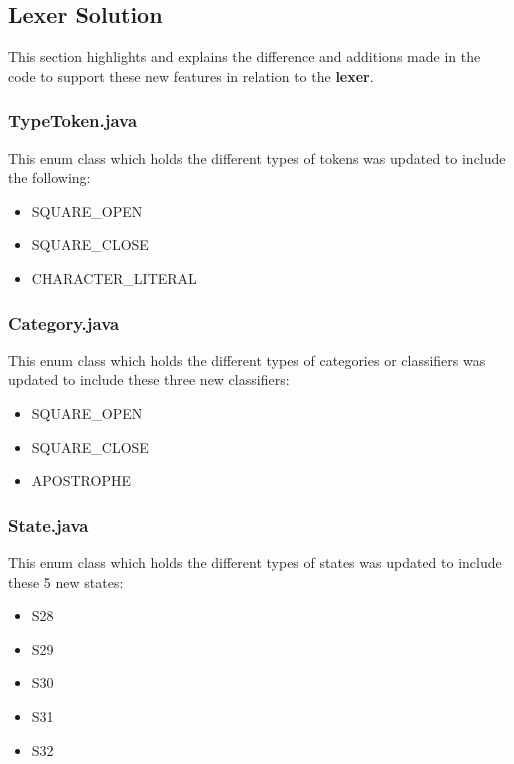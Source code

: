 \documentclass{article}
\begin{document}
			\subsection{Lexer Solution}
			
			This section highlights and explains the difference and additions made in the code to support these new features in relation to the \textbf{lexer}.
			
			\subsubsection{TypeToken.java}
					
					This enum class which holds the different types of tokens was updated to include the following:
					\begin{itemize}
						\item SQUARE\_OPEN
						\item SQUARE\_CLOSE
						\item CHARACTER\_LITERAL
					\end{itemize}
				
				\subsubsection{Category.java}
					
					This enum class which holds the different types of categories or classifiers was updated to include these three new classifiers:
					\begin{itemize}
						\item SQUARE\_OPEN
						\item SQUARE\_CLOSE
    						\item APOSTROPHE
					\end{itemize}
					
				      \subsubsection{State.java}
					
					This enum class which holds the different types of states was updated to include these 5 new states:
					\begin{itemize}
						\item S28
						\item S29
    						\item S30
    						\item S31
    						\item S32
					\end{itemize}
					
\end{document}
